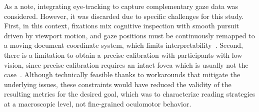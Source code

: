 As a note, integrating eye-tracking to capture complementary gaze data was considered. However, it was discarded  due to specific challenges for this study. First, in this context, fixations mix cognitive inspection with smooth pursuit driven by viewport motion, and gaze positions must be continuously remapped to a moving document coordinate system, which limits interpretability~\cite{heo_reading_2024, jacob_eye_2003, valsecchi_saccadic_2013}. Second, there is a limitation to obtain a precise calibration with participants with low vision, since precise calibration requires an intact fovea which is usually not the case~\cite{wang_understanding_2023, heo_reading_2024}. Although technically feasible thanks to workarounds that mitigate the underlying issues, these constraints would have reduced the validity of the resulting metrics for the desired goal, which was to characterize reading strategies at a macroscopic level, not fine-grained oculomotor behavior. 


